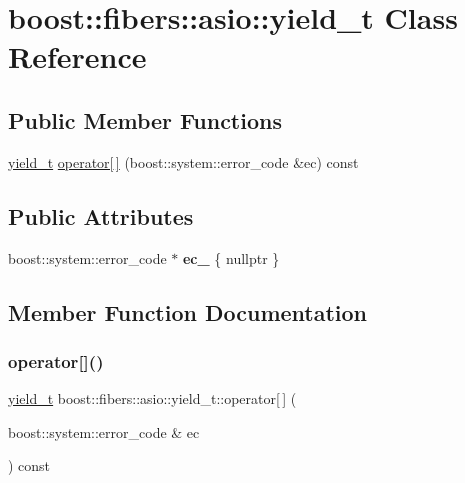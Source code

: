 \hypertarget{classboost_1_1fibers_1_1asio_1_1yield__t}{}\section{boost\+:\+:fibers\+:\+:asio\+:\+:yield\+\_\+t Class Reference}
\label{classboost_1_1fibers_1_1asio_1_1yield__t}
\subsection*{Public Member Functions}
\begin{DoxyCompactItemize}
\item 
\mbox{\hyperlink{classboost_1_1fibers_1_1asio_1_1yield__t}{yield\+\_\+t}} \mbox{\hyperlink{classboost_1_1fibers_1_1asio_1_1yield__t_ad4a1463b1c817b2d8ebe9658d09be002}{operator\mbox{[}$\,$\mbox{]}}} (boost\+::system\+::error\+\_\+code \&ec) const
\end{DoxyCompactItemize}
\subsection*{Public Attributes}
\begin{DoxyCompactItemize}
\item 
\mbox{\label{classboost_1_1fibers_1_1asio_1_1yield__t_a4908b45c6c123136bfbc1093ba963a0b}} 
boost\+::system\+::error\+\_\+code $\ast$ {\bfseries ec\+\_\+} \{ nullptr \}
\end{DoxyCompactItemize}


\subsection{Member Function Documentation}
\mbox{\label{classboost_1_1fibers_1_1asio_1_1yield__t_ad4a1463b1c817b2d8ebe9658d09be002}} 
\subsubsection{\texorpdfstring{operator[]()}{operator[]()}}
{\footnotesize\ttfamily \mbox{\hyperlink{classboost_1_1fibers_1_1asio_1_1yield__t}{yield\+\_\+t}} boost\+::fibers\+::asio\+::yield\+\_\+t\+::operator\mbox{[}$\,$\mbox{]} (\begin{DoxyParamCaption}\item[{boost\+::system\+::error\+\_\+code \&}]{ec }\end{DoxyParamCaption}) const\hspace{0.3cm}{\ttfamily [inline]}}


